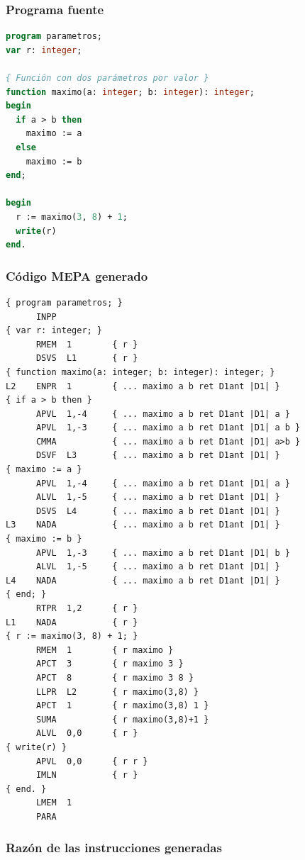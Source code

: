 \documentclass[12pt]{article}
\begin{document}
\subsubsection*{Programa fuente}
\begin{lstlisting}[frame=single, language=pascal, basicstyle=\ttfamily\small]
program parametros;
var r: integer;

{ Función con dos parámetros por valor }
function maximo(a: integer; b: integer): integer;
begin
  if a > b then
    maximo := a
  else
    maximo := b
end;

begin
  r := maximo(3, 8) + 1;
  write(r)
end.
\end{lstlisting}

\subsubsection*{Código MEPA generado}
\begin{lstlisting}[frame=single, basicstyle=\ttfamily\small, breaklines=true]
{ program parametros; }
      INPP
{ var r: integer; }
      RMEM  1        { r }
      DSVS  L1       { r }
{ function maximo(a: integer; b: integer): integer; }
L2    ENPR  1        { ... maximo a b ret D1ant |D1| }
{ if a > b then }
      APVL  1,-4     { ... maximo a b ret D1ant |D1| a }
      APVL  1,-3     { ... maximo a b ret D1ant |D1| a b }
      CMMA           { ... maximo a b ret D1ant |D1| a>b }
      DSVF  L3       { ... maximo a b ret D1ant |D1| }
{ maximo := a }
      APVL  1,-4     { ... maximo a b ret D1ant |D1| a }
      ALVL  1,-5     { ... maximo a b ret D1ant |D1| }
      DSVS  L4       { ... maximo a b ret D1ant |D1| }
L3    NADA           { ... maximo a b ret D1ant |D1| }
{ maximo := b }
      APVL  1,-3     { ... maximo a b ret D1ant |D1| b }
      ALVL  1,-5     { ... maximo a b ret D1ant |D1| }
L4    NADA           { ... maximo a b ret D1ant |D1| }
{ end; }
      RTPR  1,2      { r }
L1    NADA           { r }
{ r := maximo(3, 8) + 1; }
      RMEM  1        { r maximo }
      APCT  3        { r maximo 3 }
      APCT  8        { r maximo 3 8 }
      LLPR  L2       { r maximo(3,8) }
      APCT  1        { r maximo(3,8) 1 }
      SUMA           { r maximo(3,8)+1 }
      ALVL  0,0      { r }
{ write(r) }
      APVL  0,0      { r r }
      IMLN           { r }
{ end. }
      LMEM  1
      PARA
\end{lstlisting}

\subsubsection*{Razón de las instrucciones generadas}
\end{document}

